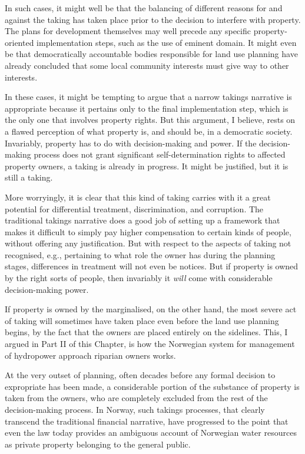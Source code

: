 In such cases, it might well be that the balancing of different reasons for and against the taking has taken place prior to the decision to interfere with property. The plans for development themselves may well precede any specific property-oriented implementation steps, such as the use of eminent domain. It might even be that democratically accountable bodies responsible for land use planning have already concluded that some local community interests must give way to other interests.

In these cases, it might be tempting to argue that a narrow takings narrative is appropriate because it pertains only to the final implementation step, which is the only one that involves property rights. But this argument, I believe, rests on a flawed perception of what property is, and should be, in a democratic society. Invariably, property has to do with decision-making and power. If the decision-making process does not grant significant self-determination rights to affected property owners, a taking is already in progress. It might be justified, but it is still a taking. 

More worryingly, it is clear that this kind of taking carries with it a great potential for differential treatment, discrimination, and corruption. The traditional takings narrative does a good job of setting up a framework that makes it difficult to simply pay higher compensation to certain kinds of people, without offering any justification. But with respect to the aspects of taking not recognised, e.g., pertaining to what role the owner has during the planning stages, differences in treatment will not even be notices. But if property is owned by the right sorts of people, then invariably it {\it will} come with considerable decision-making power. 

If property is owned by the marginalised, on the other hand, the most severe act of taking will sometimes have taken place even before the land use planning begins, by the fact that the owners are placed entirely on the sidelines. This, I argued in Part II of this Chapter, is how the Norwegian system for management of hydropower approach riparian owners works. 

At the very outset of planning, often decades before any formal decision to expropriate has been made, a considerable portion of the substance of property is taken from the owners, who are completely excluded from the rest of the decision-making process. In Norway, such takings processes, that clearly transcend the traditional financial narrative, have progressed to the point that even the law today provides an ambiguous account of Norwegian water resources as private property belonging to the general public.

